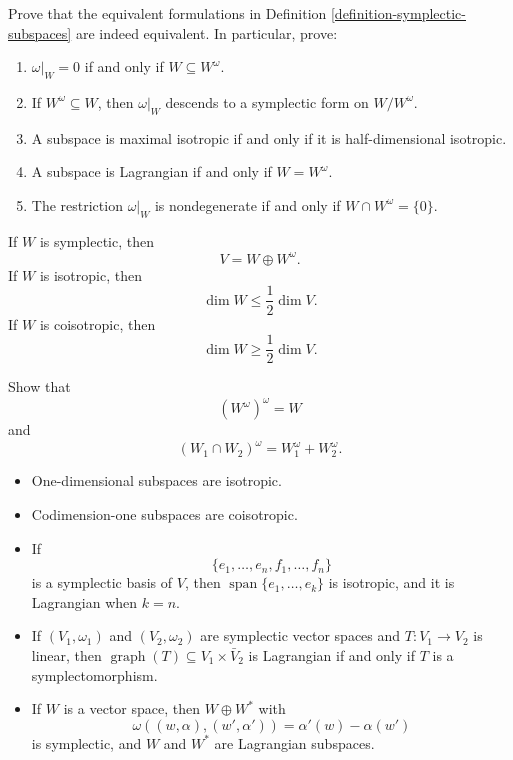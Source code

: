 \begin{exercise}
\label{exercise-equivalent-definitions-symplectic-subspaces}
Prove that the equivalent formulations in
Definition
\ref{definition-symplectic-subspaces}
are indeed equivalent. In particular, prove:
\begin{enumerate}
\item $\omega|_W=0$ if and only if
$W\subseteq W^\omega$.

\item If $W^\omega\subseteq W$, then
$\omega|_W$ descends to a symplectic form on
$W/W^\omega$.

\item A subspace is maximal isotropic if and
only if it is half-dimensional isotropic.

\item A subspace is Lagrangian if and only if
$W=W^\omega$.

\item The restriction $\omega|_W$ is
nondegenerate if and only if
$W\cap W^\omega=\{0\}$.
\end{enumerate}
\end{exercise}

\begin{remark}
If $W$ is symplectic, then
$$
V=W \oplus W^\omega.
$$
If $W$ is isotropic, then
$$
\dim W \leq \frac{1}{2}\dim V.
$$
If $W$ is coisotropic, then
$$
\dim W \geq \frac{1}{2}\dim V.
$$
\end{remark}

\begin{exercise}
\label{exercise-symplectic-orthogonal}
Show that
$$
(W^\omega)^\omega = W
$$
and
$$
(W_1 \cap W_2)^\omega = W_1^\omega + W_2^\omega.
$$
\end{exercise}

\begin{example}
\leavevmode
\begin{itemize}
\item One-dimensional subspaces are
isotropic.
\item Codimension-one subspaces are
coisotropic.
\item If
$$
\{e_1,\ldots,e_n,f_1,\ldots,f_n\}
$$
is a symplectic basis of $V$, then
\(\operatorname{span}\{e_1,\ldots,e_k\}\)
is isotropic, and it is Lagrangian when
$k=n$.
\item If $(V_1,\omega_1)$ and
$(V_2,\omega_2)$ are symplectic vector
spaces and $T:V_1 \to V_2$ is linear, then
$\operatorname{graph}(T) \subseteq
V_1 \times \bar V_2$ is Lagrangian if and
only if $T$ is a symplectomorphism.
\item If $W$ is a vector space, then
$W \oplus W^*$ with
$$
\omega((w,\alpha),(w',\alpha'))
=\alpha'(w)-\alpha(w')
$$
is symplectic, and $W$ and $W^*$ are
Lagrangian subspaces.
\end{itemize}
\end{example}

